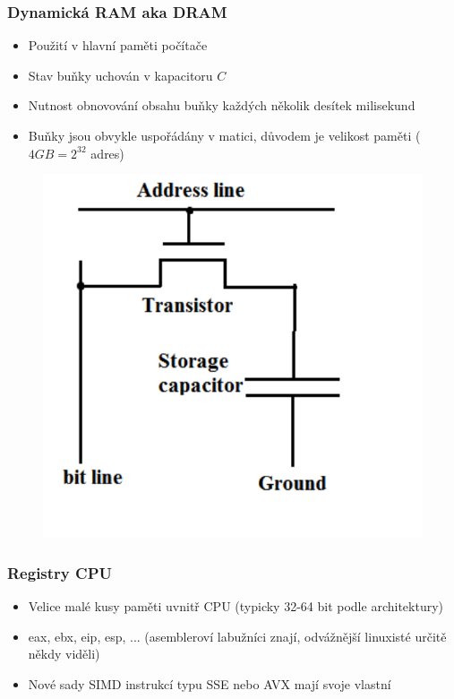 \documentclass[professionalfonts,svgnames]{beamer}
\begin{document}
 \begin{frame}
\frametitle{Dynamická RAM aka DRAM}
\begin{itemize}
\item Použití v hlavní paměti počítače
\item Stav buňky uchován v kapacitoru $C$
\item Nutnost obnovování obsahu buňky každých několik desítek milisekund
\item Buňky jsou obvykle uspořádány v matici, důvodem je velikost paměti ($4GB = 2^{32}$ adres)
\end{itemize}
\begin{figure}[h]
	\includegraphics[scale=0.5]{fig/dram}
\end{figure}
\end{frame}

 \begin{frame}
\frametitle{Registry CPU}
\begin{itemize}
\item Velice malé kusy paměti uvnitř CPU (typicky 32-64 bit podle architektury)
\item eax, ebx, eip, esp, ... (asembleroví labužníci znají, odvážnější linuxisté určitě někdy viděli)
\item Nové sady SIMD instrukcí typu SSE nebo AVX mají svoje vlastní
\end{itemize}
\end{frame}
\end{document}
